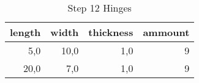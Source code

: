\begin{table}[h!]
\centering
\caption{Step 12 Hinges}
\begin{tabular}{rrrr}
\toprule
 length &  width &  thickness &  ammount \\
\midrule
    5,0 &   10,0 &        1,0 &        9 \\
   20,0 &    7,0 &        1,0 &        9 \\
\bottomrule
\end{tabular}
\end{table}
